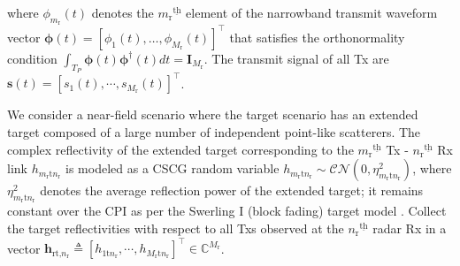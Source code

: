 \documentclass[9pt,journal]{IEEEtran}
\newcommand{\bracket}[1]{{\left [{#1}\right ]}}
\newcommand{\ith}[1]    {{#1}^{\underline{\text{th}}}}
\newcommand{\rr}{_\mathrm{r}}
\newcommand{\target}{\mathrm{t}}
\theoremstyle{definition}
\begin{document}
where $\phi_{m_\mathrm{r}}(t)$
denotes the $\ith{m_\mathrm{r}}$ element of the narrowband transmit waveform vector $\boldsymbol{\phi}(t)=\left[ \phi_1(t),\dots,\phi_{M_\mathrm{r}}(t)\right]^\top$ that satisfies the orthonormality condition $\int_{T_\mathit{P}}^{}\boldsymbol{\phi}(t)\boldsymbol{\phi}^\dagger(t)dt=\mathbf{I}_{M_\mathrm{r}}$.   The transmit signal of all Tx are $\mathbf{s}(t)=\bracket{s_1(t),\cdots,s_{M_\mathrm{r}}(t)}^\top$. 

We consider a near-field scenario where the target scenario has an extended target composed of a large number of independent point-like scatterers. %
The complex reflectivity of the extended target corresponding to the $\ith{m\rr}$ Tx - $\ith{n\rr}$ Rx link $h_{m\rr \target n\rr }$ is modeled as a CSCG random variable $h_{m\rr \target n\rr }\sim\mathcal{CN}(0,\eta^2_{m\rr\target n\rr})$, where $\eta^2_{m\rr\textrm{t}n\rr}$ denotes the average reflection power of the extended target; it remains constant over the CPI as per the Swerling I (block fading) target model \cite{fisher2006MIMO,haimovich2008mimo}. Collect the target reflectivities with respect to all Txs observed at the $\ith{n\rr}$ radar Rx in a vector $\mathbf{h}_{\textrm{rt,}n\rr}\triangleq\bracket{h_{1\textrm{t}n\rr},\cdots,h_{M\rr\textrm{t}n\rr}}^\top\in\mathbb{C}^{M\rr}$. 
\end{document}
